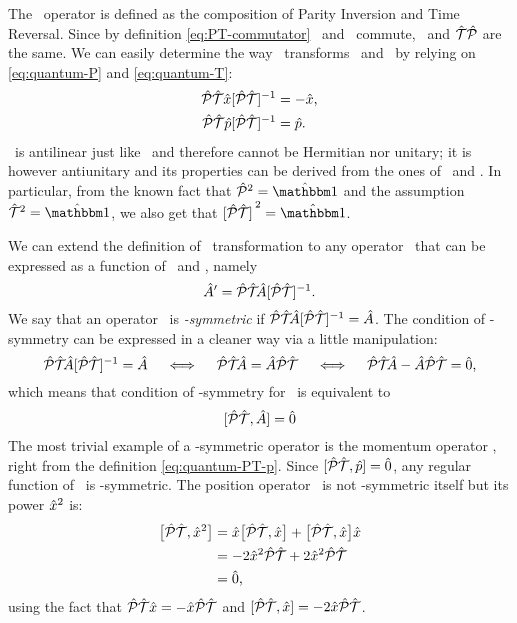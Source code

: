         The \hPT\ operator is defined as the composition of Parity Inversion and Time Reversal. Since by definition \eqref{eq:PT-commutator} \hP\ and \hT\ commute, \hPT\ and $\mathcal{\hat{T}}\mathcal{\hat{P}}$ are the same. We can easily determine the way \hPT\ transforms \hx\ and \hp\ by relying on \eqref{eq:quantum-P} and \eqref{eq:quantum-T}:
        \begin{align}
            \label{eq:quantum-PT-x}
            \hPT\hx\bqty*{\hPT}\!^{-1}
            &= -\hx
            \mycomma
            \\
            \label{eq:quantum-PT-p}
            \hPT\hp\bqty*{\hPT}\!^{-1}
            &= \hp
            \myperiod
        \end{align}
        \hPT\ is antilinear just like \hT\ and therefore cannot be Hermitian nor unitary; it is however antiunitary and its properties can be derived from the ones of \hP\ and \hT. In particular, from the known fact that $\hP^2 = \hidM$ and the assumption $\hT^2 = \hidM$, we also get that $\bqty*{\hPT}^2 = \hidM$. 

        We can extend the definition of \PT\ transformation to any operator \hA\ that can be expressed as a function of \hx\ and \hp, namely
        \begin{equation}
            \label{eq:pt-transform}
            \hA' = \PTtransform{\hA}
            \myperiod
        \end{equation}
        We say that an operator \hA\ is \emph{\PT-symmetric} if $\PTtransform{\hA} = \hA$. The condition of \PT-symmetry can be expressed in a cleaner way via a little manipulation:
        \begin{equation*}
            \PTtransform{\hA} = \hA
            \quad\iff\quad
            \hPT\!\hA = \hA\hPT
            \quad\iff\quad
            \hPT\!\hA - \hA\hPT = \hzero
            \mycomma
        \end{equation*}
        which means that condition of \PT-symmetry for \hA\ is equivalent to
        \begin{equation}
            \label{eq:pt-symmetric-operator}
            \comm*{\hPT}{\hA}\! = \hzero
        \end{equation}
        The most trivial example of a \PT-symmetric operator is the momentum operator \hp, right from the definition \eqref{eq:quantum-PT-p}. Since $\comm*{\hPT}{\hp}\! = \hzero$, any regular function of \hp\ is \PT-symmetric. The position operator \hx\ is not \PT-symmetric itself but its power $\hat{x}^2$ is:
        \begin{align*}
            \bigl[\mathcal{\hat{P}}\mathcal{\hat{T}},\hat{x}^2\bigr]
            &= \hat{x} \bigl[\mathcal{\hat{P}}\mathcal{\hat{T}},\hat{x}\bigr] + \bigl[\mathcal{\hat{P}}\mathcal{\hat{T}},\hat{x}\bigr] \hat{x} \\
            &= -2\hat{x}^2\mathcal{\hat{P}}\mathcal{\hat{T}} + 2\hat{x}^2\mathcal{\hat{P}}\mathcal{\hat{T}} \\
            &= \hat{0} 
            \text{,}
        \end{align*}
        using the fact that $\mathcal{\hat{P}}\mathcal{\hat{T}} \hat{x} = -\hat{x} \mathcal{\hat{P}}\mathcal{\hat{T}}$ and $\comm*{\hPT}{\hx}\! = -2\hx\hPT$.

